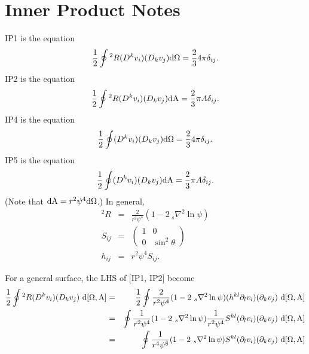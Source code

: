 \documentclass[11pt]{article}
\begin{document}
\section{Inner Product Notes}
IP1 is the equation
\begin{equation}
\frac{1}{2} \oint {^2}R (D^k v_i)(D_k v_j) {\rm d \Omega} = \frac{2}{3} 4 \pi \delta_{ij}.
\end{equation}
IP2 is the equation
\begin{equation}
\frac{1}{2} \oint {^2}R (D^k v_i)(D_k v_j) {\rm d A} = \frac{2}{3}  \pi A \delta_{ij}.
\end{equation}
IP4 is the equation
\begin{equation}
\frac{1}{2} \oint  (D^k v_i)(D_k v_j) {\rm d \Omega} = \frac{2}{3} 4 \pi \delta_{ij}.
\end{equation}
IP5 is the equation
\begin{equation}
\frac{1}{2} \oint  (D^k v_i)(D_k v_j) {\rm d A} = \frac{2}{3}  \pi A \delta_{ij}.
\end{equation}
(Note that ${\rm dA} = r^2 \psi^4 {\rm d\Omega}$.) In general,
\begin{eqnarray}
{^2}R &=& \frac{2}{r^2 \psi^4} (1-2{~_s}\nabla^2 \ln \psi)\\
S_{ij} &=& \left( \begin{matrix} 1&0 \\ 0 & \sin^2 \theta \end{matrix} \right) \\
h_{ij} &=& r^2 \psi^4 S_{ij}.
\end{eqnarray}

\noindent
For a general surface, the LHS of [IP1, IP2] become
\begin{eqnarray}
\frac{1}{2} \oint {^2}R (D^k v_i)(D_k v_j) {~\rm d [\Omega, A]}
&=& \frac{1}{2} \oint \frac{2}{r^2 \psi^4}(1-2{~_s}\nabla^2 \ln \psi) (h^{kl} \partial_l v_i) (\partial_k v_j) {~\rm d [\Omega,A]} \\
&=& \oint \frac{1}{r^2 \psi^4}(1-2{~_s}\nabla^2 \ln \psi) \frac{1}{r^2 \psi^4} S^{kl} (\partial_l v_{i})(\partial_k v_{j}) {~\rm d [\Omega,A]} \\
&=& \oint \frac{1}{r^4 \psi^8}(1-2{~_s}\nabla^2 \ln \psi) S^{kl} (\partial_l v_{i})(\partial_k v_{j}) {~\rm d [\Omega,A]}
\end{eqnarray}
\end{document}
